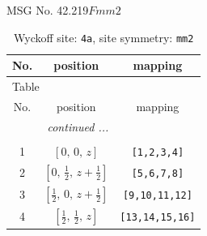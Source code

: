 \documentclass[fleqn,8pt]{jsarticle}
\begin{document}
\setcounter{MaxMatrixCols}{32}

\renewcommand{\tablename}{Table~}
\renewcommand{\figurename}{Figure~}
\begin{center}
\LARGE
MSG No. 42.219\quad$Fmm2$
\end{center}
\renewcommand{\arraystretch}{1.2}
\begin{longtable}{ccc}
\caption{Wyckoff site: {\tt 4a}, site symmetry: {\tt mm2}}
 \\
 \hline \hline
No. & position & mapping \\ \hline \endfirsthead

\multicolumn{2}{l}{\tablename\ \thetable{}} \\
 \hline \hline
No. & position & mapping \\ \hline \endhead

 \hline \hline
\multicolumn{2}{r}{\footnotesize\it continued ...} \\ \endfoot

 \hline \hline
\multicolumn{2}{r}{} \\ \endlastfoot

1 & $\left[ 0,\, 0,\, z \right]$ & {\tt [1,2,3,4]} \\ \hline
2 & $\left[ 0,\, \frac{1}{2},\, z + \frac{1}{2} \right]$ & {\tt [5,6,7,8]} \\ \hline
3 & $\left[ \frac{1}{2},\, 0,\, z + \frac{1}{2} \right]$ & {\tt [9,10,11,12]} \\ \hline
4 & $\left[ \frac{1}{2},\, \frac{1}{2},\, z \right]$ & {\tt [13,14,15,16]} \\
\end{longtable}
\renewcommand{\arraystretch}{1.2}
\end{document}
